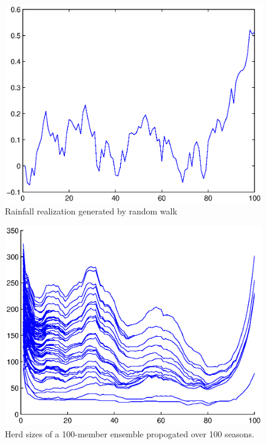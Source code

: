 \documentclass[letterpaper]{tufte-handout}
\begin{document}
\begin{figure}
\includegraphics[width=\textwidth]{rfe}
\caption{Rainfall realization generated by random walk}
\label{rfe}
\end{figure}
\begin{figure}
\includegraphics[width=\textwidth]{herdsize}
\caption{Herd sizes of a 100-member ensemble propogated over 100 seasons.}
\label{ensemble}
\end{figure}

\newpage
{\scriptsize

\label{code}
}
\end{document}
